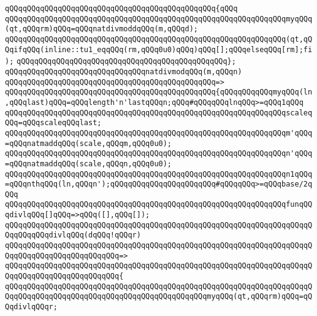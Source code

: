 \verb|qQQqqQQqqQQqqQQqqQQqqQQqqQQqqQQqqQQqqQQqqQQqqQQq{qQQq|\newline
\verb|qQQqqQQqqQQqqQQqqQQqqQQqqQQqqQQqqQQqqQQqqQQqqQQqqQQqqQQqqQQqqQQqmyqQQq(qt,qQQqrm)qQQq=qQQqnatdivmoddqQQq(m,qQQqd);|\newline
\verb|qQQqqQQqqQQqqQQqqQQqqQQqqQQqqQQqqQQqqQQqqQQqqQQqqQQqqQQqqQQqqQQq(qt,qQQqifqQQq(inline::tu1_eqqQQq(rm,qQQq0u0)qQQq)qQQq[];qQQqelseqQQq[rm];fi);|\newline
\verb|qQQqqQQqqQQqqQQqqQQqqQQqqQQqqQQqqQQqqQQqqQQqqQQq};|\newline
\newline
\verb|qQQqqQQqqQQqqQQqqQQqqQQqqQQqqQQqnatdivmodqQQq(m,qQQqn)|\newline
\verb|qQQqqQQqqQQqqQQqqQQqqQQqqQQqqQQqqQQqqQQqqQQqqQQq=>|\newline
\verb|qQQqqQQqqQQqqQQqqQQqqQQqqQQqqQQqqQQqqQQqqQQqqQQq{qQQqqQQqqQQqmyqQQq(ln,qQQqlast)qQQq=qQQqlength'n'lastqQQqn;qQQq#qQQqqQQqlnqQQq>=qQQq1qQQq|\newline
\newline
\verb|qQQqqQQqqQQqqQQqqQQqqQQqqQQqqQQqqQQqqQQqqQQqqQQqqQQqqQQqqQQqqQQqscaleqQQq=qQQqscaleqQQqlast;|\newline
\newline
\verb|qQQqqQQqqQQqqQQqqQQqqQQqqQQqqQQqqQQqqQQqqQQqqQQqqQQqqQQqqQQqqQQqm'qQQq=qQQqnatmaddqQQq(scale,qQQqm,qQQq0u0);|\newline
\verb|qQQqqQQqqQQqqQQqqQQqqQQqqQQqqQQqqQQqqQQqqQQqqQQqqQQqqQQqqQQqqQQqn'qQQq=qQQqnatmaddqQQq(scale,qQQqn,qQQq0u0);|\newline
\newline
\verb|qQQqqQQqqQQqqQQqqQQqqQQqqQQqqQQqqQQqqQQqqQQqqQQqqQQqqQQqqQQqqQQqn1qQQq=qQQqnthqQQq(ln,qQQqn');qQQqqQQqqQQqqQQqqQQqqQQq#qQQqqQQq>=qQQqbase/2qQQq|\newline
\newline
\verb|qQQqqQQqqQQqqQQqqQQqqQQqqQQqqQQqqQQqqQQqqQQqqQQqqQQqqQQqqQQqqQQqfunqQQqdivlqQQq[]qQQq=>qQQq([],qQQq[]);|\newline
\newline
\verb|qQQqqQQqqQQqqQQqqQQqqQQqqQQqqQQqqQQqqQQqqQQqqQQqqQQqqQQqqQQqqQQqqQQqqQQqqQQqqQQqdivlqQQq(dqQQq!qQQqr)|\newline
\verb|qQQqqQQqqQQqqQQqqQQqqQQqqQQqqQQqqQQqqQQqqQQqqQQqqQQqqQQqqQQqqQQqqQQqqQQqqQQqqQQqqQQqqQQqqQQqqQQq=>|\newline
\verb|qQQqqQQqqQQqqQQqqQQqqQQqqQQqqQQqqQQqqQQqqQQqqQQqqQQqqQQqqQQqqQQqqQQqqQQqqQQqqQQqqQQqqQQqqQQqqQQq{|\newline
\verb|qQQqqQQqqQQqqQQqqQQqqQQqqQQqqQQqqQQqqQQqqQQqqQQqqQQqqQQqqQQqqQQqqQQqqQQqqQQqqQQqqQQqqQQqqQQqqQQqqQQqqQQqqQQqqQQqqQQqmyqQQq(qt,qQQqrm)qQQq=qQQqdivlqQQqr;|\newline
